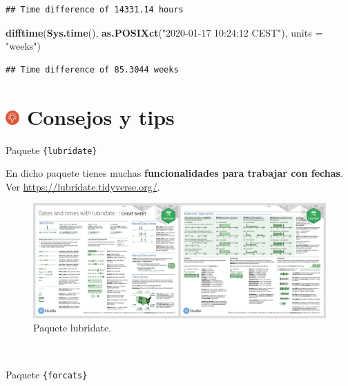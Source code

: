 \documentclass[11pt,]{book}
\newenvironment{Shaded}{\begin{snugshade}}{\end{snugshade}}
\newcommand{\DataTypeTok}[1]{\textcolor[rgb]{0.27,0.27,0.27}{#1}}
\newcommand{\KeywordTok}[1]{\textcolor[rgb]{0.27,0.27,0.27}{\textbf{#1}}}
\newcommand{\NormalTok}[1]{#1}
\newcommand{\StringTok}[1]{\textcolor[rgb]{0.5,0.5,0.5}{#1}}
\begin{document}
\begin{verbatim}
## Time difference of 14331.14 hours
\end{verbatim}

\begin{Shaded}
\begin{Highlighting}[]
\KeywordTok{difftime}\NormalTok{(}\KeywordTok{Sys.time}\NormalTok{(), }\KeywordTok{as.POSIXct}\NormalTok{(}\StringTok{"2020-01-17 10:24:12 CEST"}\NormalTok{), }\DataTypeTok{units =} \StringTok{"weeks"}\NormalTok{)}
\end{Highlighting}
\end{Shaded}

\begin{verbatim}
## Time difference of 85.3044 weeks
\end{verbatim}

\hypertarget{consejos-y-tips-7}{%
\section[ Consejos y tips]{\texorpdfstring{\protect\includegraphics[width=0.04\textwidth,height=\textheight]{img/logo_info.png} Consejos y tips}{ Consejos y tips}}\label{consejos-y-tips-7}}

Paquete \texttt{\{lubridate\}}

En dicho paquete tienes muchas \textbf{funcionalidades para trabajar con fechas}. Ver \url{https://lubridate.tidyverse.org/}.

\begin{figure}

{\centering \includegraphics[width=0.95\linewidth]{./img/lubridate} 

}

\caption{Paquete lubridate.}\label{fig:lubridate}
\end{figure}

~

Paquete \texttt{\{forcats\}}
\end{document}
